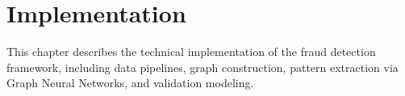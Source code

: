 \chapter{Implementation}
\label{ch:implementation}

This chapter describes the technical implementation of the fraud detection framework, including data pipelines, graph construction, pattern extraction via Graph Neural Networks, and validation modeling.










